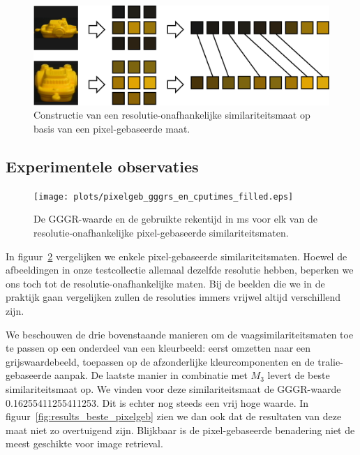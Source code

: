 \begin{figure}[tbp]
\begin{center}
\includegraphics[width=\textwidth]{images/multires.eps}
\caption{\label{fig:multires}Constructie van een resolutie-onafhankelijke similariteitsmaat op basis van een pixel-gebaseerde maat.}
\end{center}
\end{figure}

\subsection{Experimentele observaties}

\begin{figure}[tbp]
\begin{center}
\texttt{[image: plots/pixelgeb\_gggrs\_en\_cputimes\_filled.eps]}
\caption{\label{fig:pixelgeb_gggrs_en_cputimes}De GGGR-waarde en de gebruikte rekentijd in ms voor elk van de resolutie-onafhankelijke pixel-gebaseerde similariteitsmaten.}
\end{center}
\end{figure}

In figuur~\ref{fig:pixelgeb_gggrs_en_cputimes} vergelijken we enkele pixel-gebaseerde similariteitsmaten.
Hoewel de afbeeldingen in onze testcollectie allemaal dezelfde resolutie hebben, beperken we
ons toch tot de resolutie-onafhankelijke maten. Bij de beelden die we in de praktijk gaan 
vergelijken zullen de resoluties immers vrijwel altijd verschillend zijn.

We beschouwen de drie bovenstaande manieren om de vaagsimilariteitsmaten toe te passen op een 
onderdeel van een kleurbeeld:
eerst omzetten naar een grijswaardebeeld, 
toepassen op de afzonderlijke kleurcomponenten en 
de tralie-gebaseerde aanpak.
De laatste manier in combinatie met $M_{3}$ levert de beste similariteitsmaat op. We vinden
voor deze similariteitsmaat de GGGR-waarde 0.16255411255411253. Dit is echter nog steeds een
vrij hoge waarde. In figuur~\ref{fig:results_beste_pixelgeb}
zien we dan ook dat de resultaten van deze maat niet zo overtuigend zijn. Blijkbaar 
is de pixel-gebaseerde benadering niet de meest geschikte voor image retrieval. 

